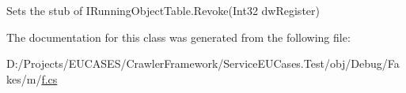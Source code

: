 Sets the stub of I\-Running\-Object\-Table.\-Revoke(\-Int32 dw\-Register)



The documentation for this class was generated from the following file\-:\begin{DoxyCompactItemize}
\item 
D\-:/\-Projects/\-E\-U\-C\-A\-S\-E\-S/\-Crawler\-Framework/\-Service\-E\-U\-Cases.\-Test/obj/\-Debug/\-Fakes/m/\hyperlink{m_2f_8cs}{f.\-cs}\end{DoxyCompactItemize}
